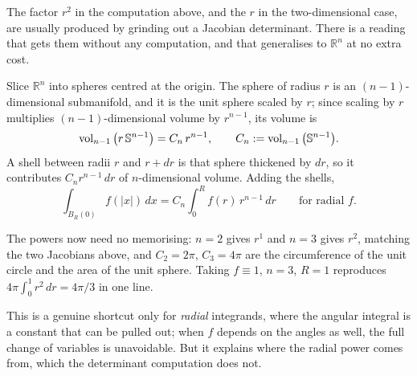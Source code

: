 \begin{remark}
\label{rem:polar_as_shells}
The factor $r^2$ in the computation above, and the $r$ in the two-dimensional case, are usually
produced by grinding out a Jacobian determinant. There is a reading that gets them without any
computation, and that generalises to $\mathbb{R}^n$ at no extra cost.

Slice $\mathbb{R}^n$ into spheres centred at the origin. The sphere of radius $r$ is an
$(n-1)$-dimensional submanifold, and it is the unit sphere scaled by $r$; since scaling by $r$
multiplies $(n-1)$-dimensional volume by $r^{n-1}$, its volume is
\[\operatorname{vol}_{n-1}\big(r\,\mathbb{S}^{n-1}\big) = C_n\,r^{n-1},
  \qquad C_n := \operatorname{vol}_{n-1}\big(\mathbb{S}^{n-1}\big).\]
A shell between radii $r$ and $r+dr$ is that sphere thickened by $dr$, so it contributes
$C_n r^{n-1}\,dr$ of $n$-dimensional volume. Adding the shells,
\[\int_{B_R(0)} f(\lvert x\rvert)\,dx = C_n\int_0^R f(r)\,r^{n-1}\,dr
  \qquad\text{for radial } f.\]

The powers now need no memorising: $n=2$ gives $r^{1}$ and $n=3$ gives $r^{2}$, matching the two
Jacobians above, and $C_2 = 2\pi$, $C_3 = 4\pi$ are the circumference of the unit circle and the
area of the unit sphere. Taking $f \equiv 1$, $n=3$, $R=1$ reproduces
$4\pi\int_0^1 r^2\,dr = 4\pi/3$ in one line.

This is a genuine shortcut only for \emph{radial} integrands, where the angular integral is a
constant that can be pulled out; when $f$ depends on the angles as well, the full change of
variables is unavoidable. But it explains where the radial power comes from, which the
determinant computation does not.
\end{remark}

